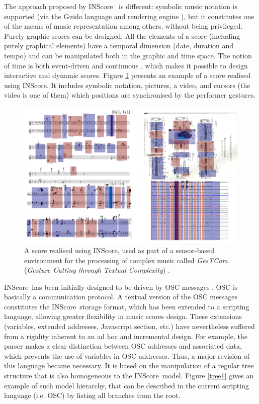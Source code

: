 \documentclass[runningheads,a4paper]{llncs}
\newcommand{\IS}		{INScore}
\begin{document}
The approach proposed by \IS\ \cite{Fober:12a} is different: symbolic music notation is supported (via the Guido language and rendering engine \cite{Dau:09b,hoos98}), but it constitutes one of the means of music representation among others, without being privileged. 
Purely graphic scores can be designed. All the elements of a score (including purely graphical elements) have a temporal dimension (date, duration and tempo) and can be manipulated both in the graphic and time space. The notion of time is both event-driven and continuous \cite{fober17c}, which makes it possible to design interactive and dynamic scores. Figure \ref{pavlos} presents an example of a score realised using \IS . It includes symbolic notation, pictures, a video, and cursors (the video is one of them) which positions are synchronised by the performer gestures.

\begin{figure}
\begin{center}
\includegraphics[width=1.0\columnwidth]{imgs/inscore-gestcom}
\caption{A score realised using \IS , used as part of a sensor-based environment for the processing of complex music called \emph{GesTCom} (\emph{Gesture Cutting through Textual Complexity}) \cite{antoniadis:tel-01861171}.}
\label{pavlos}
\end{center}
\end{figure}

\IS\ has been initially designed to be driven by OSC messages \cite{OSC}. OSC is basically a communication protocol. A textual version of the OSC messages constitutes the \IS\ storage format, which has been extended to a scripting language, \cite{Fober:13b} allowing greater flexibility in music scores design.
These extensions (variables, extended addresses, Javascript section, etc.) have nevertheless suffered from a rigidity inherent to an ad hoc and incremental design. For example, the parser makes a clear distinction between OSC addresses and associated data, which prevents the use of variables in OSC addresses.
Thus, a major revision of this language became necessary. It is based on the manipulation of a regular tree structure that is also homogeneous to the \IS\ model.
Figure \ref{tree1} gives an example of such model hierarchy, that can be described in the current scripting language (i.e. OSC) by listing all branches from the root. %
\end{document}
